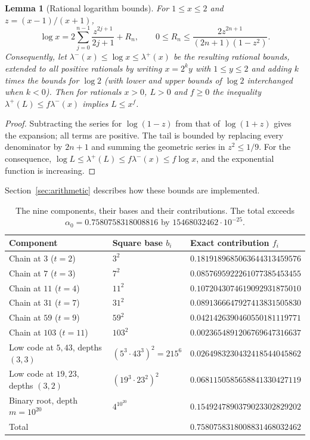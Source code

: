 \documentclass[11pt]{article}
\newtheorem{lemma}[theorem]{Lemma}
\theoremstyle{definition}
\theoremstyle{remark}
\newcommand{\al}{\alpha_0}
\begin{document}
\begin{lemma}[Rational logarithm bounds]\label{lem:logenc}
For $1\le x\le2$ and $z=(x-1)/(x+1)$,
\[
 \log x=2\sum_{j=0}^{n-1}\frac{z^{2j+1}}{2j+1}+R_n,
 \qquad 0\le R_n\le\frac{2z^{2n+1}}{(2n+1)(1-z^2)}.
\]
Consequently, let $\lambda^-(x)\le\log x\le\lambda^+(x)$ be the resulting
rational bounds, extended to all positive rationals by writing $x=2^ky$ with
$1\le y\le2$ and adding $k$ times the bounds for $\log2$ (with lower and upper
bounds of $\log 2$ interchanged when $k<0$). Then for rationals $x>0$, $L>0$ and
$f\ge0$ the inequality $\lambda^+(L)\le f\lambda^-(x)$ implies $L\le x^f$.
\end{lemma}
\begin{proof}
Subtracting the series for $\log(1-z)$ from that of $\log(1+z)$ gives the
expansion; all terms are positive. The tail is bounded by replacing every
denominator by $2n+1$ and summing the geometric series in $z^2\le1/9$.
For the consequence, $\log L\le\lambda^+(L)\le f\lambda^-(x)\le f\log x$,
and the exponential function is increasing.
\end{proof}
Section~\ref{sec:arithmetic} describes how these bounds are implemented.

\begin{table}[!h]
\centering\small
\begin{tabular}{lll}\toprule
Component & Square base $b_i$ & Exact contribution $f_i$\\\midrule
Chain at $3$ ($t=2$) & $3^2$ & $0.1819189685063644313459576$\\
Chain at $7$ ($t=3$) & $7^2$ & $0.0857695922261077385453455$\\
Chain at $11$ ($t=4$) & $11^2$ & $0.1072043074619092931875010$\\
Chain at $31$ ($t=7$) & $31^2$ & $0.0891366647927413831505830$\\
Chain at $59$ ($t=9$) & $59^2$ & $0.0421426390460550181119771$\\
Chain at $103$ ($t=11$) & $103^2$ & $0.0023654891206769647316637$\\
Low code at $5,43$, depths $(3,3)$ & $(5^3\cdot43^3)^2=215^6$ & $0.0264983230432418544045862$\\
Low code at $19,23$, depths $(3,2)$ & $(19^3\cdot23^2)^2$ & $0.0681150585658841330427119$\\
Binary root, depth $m=10^{20}$ & $4^{10^{20}}$ & $0.1549247890379023302829202$\\\midrule
Total & & $0.7580758318008831468032462$\\\bottomrule
\end{tabular}
\caption{The nine components, their bases and their contributions. The total
exceeds $\al=0.7580758318008816$ by $15468032462\cdot10^{-25}$.}\label{tab:powers}
\end{table}
\end{document}
